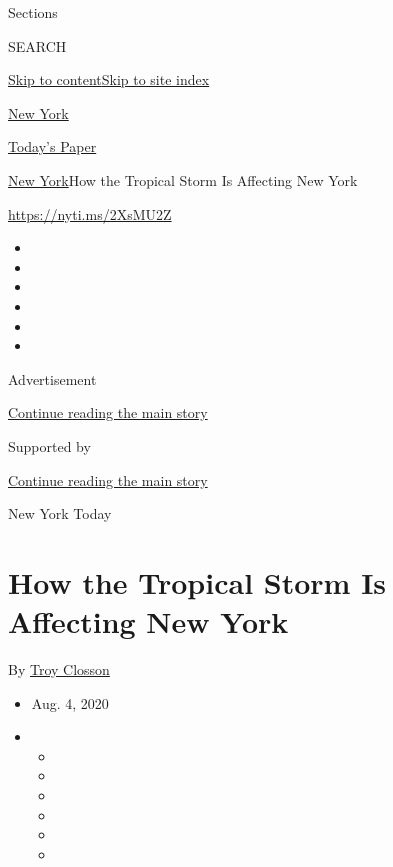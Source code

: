 Sections

SEARCH

\protect\hyperlink{site-content}{Skip to
content}\protect\hyperlink{site-index}{Skip to site index}

\href{https://www.nytimes.com/section/nyregion}{New York}

\href{https://myaccount.nytimes.com/auth/login?response_type=cookie\&client_id=vi}{}

\href{https://www.nytimes.com/section/todayspaper}{Today's Paper}

\href{/section/nyregion}{New York}\textbar{}How the Tropical Storm Is
Affecting New York

\url{https://nyti.ms/2XsMU2Z}

\begin{itemize}
\item
\item
\item
\item
\item
\item
\end{itemize}

Advertisement

\protect\hyperlink{after-top}{Continue reading the main story}

Supported by

\protect\hyperlink{after-sponsor}{Continue reading the main story}

New York Today

\hypertarget{how-the-tropical-storm-is-affecting-new-york}{%
\section{How the Tropical Storm Is Affecting New
York}\label{how-the-tropical-storm-is-affecting-new-york}}

By \href{https://www.nytimes.com/by/troy-closson}{Troy Closson}

\begin{itemize}
\item
  Aug. 4, 2020
\item
  \begin{itemize}
  \item
  \item
  \item
  \item
  \item
  \item
  \end{itemize}
\end{itemize}

